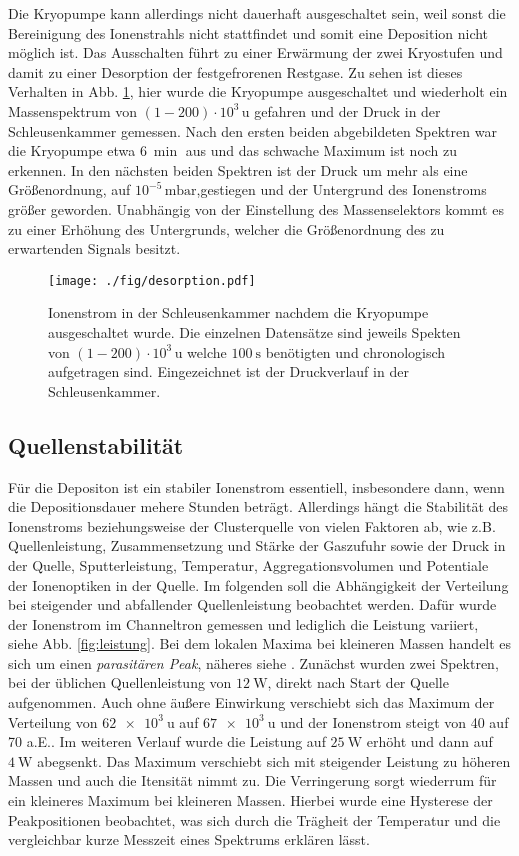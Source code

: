 Die Kryopumpe kann allerdings nicht dauerhaft ausgeschaltet sein, weil sonst die Bereinigung des Ionenstrahls nicht stattfindet und somit eine Deposition nicht möglich ist.
Das Ausschalten führt zu einer Erwärmung der zwei Kryostufen und damit zu einer Desorption der festgefrorenen Restgase.
Zu sehen ist dieses Verhalten in Abb. \ref{fig:desorp}, hier wurde die Kryopumpe ausgeschaltet und wiederholt ein Massenspektrum von $(1-200)\cdot 10^3\,\text{u}$ gefahren und der Druck in der Schleusenkammer gemessen.
Nach den ersten beiden abgebildeten Spektren war die Kryopumpe etwa $\SI{6}{\min}$ aus und das schwache Maximum ist noch zu erkennen.
In den nächsten beiden Spektren ist der Druck um mehr als eine Größenordnung, auf $10^{-5}\,\text{mbar}$,gestiegen und der Untergrund des Ionenstroms größer geworden.
Unabhängig von der Einstellung des Massenselektors kommt es zu einer Erhöhung des Untergrunds, welcher die Größenordnung des zu erwartenden Signals besitzt.
\begin{figure}
  \centering
  \texttt{[image: ./fig/desorption.pdf]}
  \caption{Ionenstrom in der Schleusenkammer nachdem die Kryopumpe ausgeschaltet wurde. Die einzelnen Datensätze sind jeweils Spekten von $(1-200)\cdot 10^3\,\text{u}$ welche $\SI{100}{\second}$ benötigten und chronologisch aufgetragen sind. Eingezeichnet ist der Druckverlauf in der Schleusenkammer.}
  \label{fig:desorp}
\end{figure}

\subsection{Quellenstabilität}
\label{sec:leistung}
Für die Depositon ist ein stabiler Ionenstrom essentiell, insbesondere dann, wenn die Depositionsdauer mehere Stunden beträgt.
Allerdings hängt die Stabilität des Ionenstroms beziehungsweise der Clusterquelle von vielen Faktoren ab, wie z.B. Quellenleistung, Zusammensetzung und Stärke der Gaszufuhr sowie der Druck in der Quelle, Sputterleistung, Temperatur, Aggregationsvolumen und Potentiale der Ionenoptiken in der Quelle.
Im folgenden soll die Abhängigkeit der Verteilung bei steigender und abfallender Quellenleistung beobachtet werden.
Dafür wurde der Ionenstrom im Channeltron gemessen und lediglich die Leistung variiert, siehe Abb. \ref{fig:leistung}.
Bei dem lokalen Maxima bei kleineren Massen handelt es sich um einen \textit{parasitären Peak}, näheres siehe \cite{gust}.
Zunächst wurden zwei Spektren, bei der üblichen Quellenleistung von $\SI{12}{\watt}$, direkt nach Start der Quelle aufgenommen. 
Auch ohne äußere Einwirkung verschiebt sich das Maximum der Verteilung von $\SI{62e3}{\amu}$ auf $\SI{67e3}{\amu}$ und der Ionenstrom steigt von 40 auf 70 a.E..
Im weiteren Verlauf wurde die Leistung auf $\SI{25}{\watt}$ erhöht und dann auf $\SI{4}{\watt}$ abegsenkt.
Das Maximum verschiebt sich mit steigender Leistung zu höheren Massen und auch die Itensität nimmt zu.
Die Verringerung sorgt wiederrum für ein kleineres Maximum bei kleineren Massen.
Hierbei wurde eine Hysterese der Peakpositionen beobachtet, was sich durch die Trägheit der Temperatur und die vergleichbar kurze Messzeit eines Spektrums erklären lässt.

